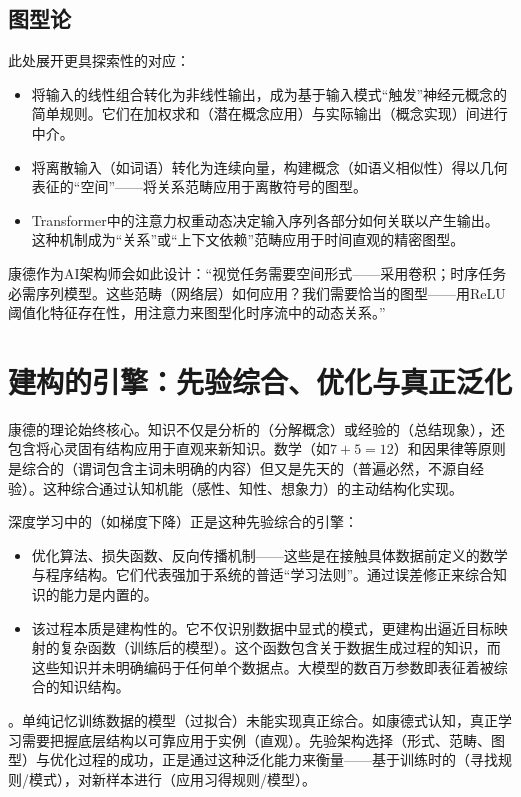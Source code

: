 \subsection*{图型论}
此处展开更具探索性的对应：
\begin{itemize}
\item{} 将输入的线性组合转化为非线性输出，成为基于输入模式“触发”神经元概念的简单规则。它们在加权求和（潜在概念应用）与实际输出（概念实现）间进行中介。
\item{} 将离散输入（如词语）转化为连续向量，构建概念（如语义相似性）得以几何表征的“空间”——将关系范畴应用于离散符号的图型。
\item{} Transformer中的注意力权重动态决定输入序列各部分如何关联以产生输出。这种机制成为“关系”或“上下文依赖”范畴应用于时间直观的精密图型。
\end{itemize}

康德作为AI架构师会如此设计：“视觉任务需要空间形式——采用卷积；时序任务必需序列模型。这些范畴（网络层）如何应用？我们需要恰当的图型——用ReLU阈值化特征存在性，用注意力来图型化时序流中的动态关系。”

\section{建构的引擎：先验综合、优化与真正泛化}

康德的理论始终核心。知识不仅是分析的（分解概念）或经验的（总结现象），还包含将心灵固有结构应用于直观来新知识。数学（如\(7+5=12\)）和因果律等原则是综合的（谓词包含主词未明确的内容）但又是先天的（普遍必然，不源自经验）。这种综合通过认知机能（感性、知性、想象力）的主动结构化实现。

深度学习中的（如梯度下降）正是这种先验综合的引擎：
\begin{itemize}
\item{} 优化算法、损失函数、反向传播机制——这些是在接触具体数据前定义的数学与程序结构。它们代表强加于系统的普适“学习法则”。通过误差修正来综合知识的能力是内置的。
\item{} 该过程本质是建构性的。它不仅识别数据中显式的模式，更建构出逼近目标映射的复杂函数（训练后的模型）。这个函数包含关于数据生成过程的知识，而这些知识并未明确编码于任何单个数据点。大模型的数百万参数即表征着被综合的知识结构。
\end{itemize}

。单纯记忆训练数据的模型（过拟合）未能实现真正综合。如康德式认知，真正学习需要把握底层结构以可靠应用于实例（直观）。先验架构选择（形式、范畴、图型）与优化过程的成功，正是通过这种泛化能力来衡量——基于训练时的（寻找规则/模式），对新样本进行（应用习得规则/模型）。


